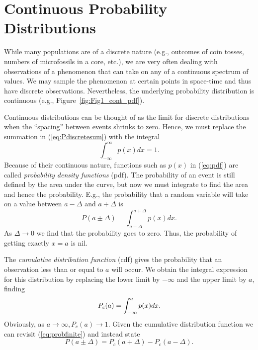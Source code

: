 \section{Continuous Probability Distributions}

	While many populations are of a discrete nature (e.g., outcomes of coin tosses, numbers of 
microfossils in a core, etc.), we are very often dealing with observations of a phenomenon that 
can take on any of a continuous spectrum of values.  We may sample the phenomenon at certain 
points in space-time and thus have discrete observations.  Nevertheless, the underlying probability 
distribution is continuous (e.g., Figure~\ref{fig:Fig1_cont_pdf}).


	Continuous distributions can be thought of as the limit for discrete distributions when the 
``spacing'' between events shrinks to zero.  Hence, we must replace the summation in (\ref{eq:Pdiscretesum}) with the integral
\begin{equation}
\int^\infty _{-\infty} p (x) d x = 1.
\label{eq:pdf}
\end{equation}
Because of their continuous nature, functions such as $p(x)$ in (\ref{eq:pdf}) are called \emph{probability} 
\emph{density functions} (pdf).  The probability of an event is still defined by the area under the curve, but 
now we must integrate to find the area and hence the probability.
E.g.,  the probability that a random variable will take on a  value between $a - \Delta$  and $a +\Delta$ is 
\begin{equation}
P(a\pm \Delta) =  \int ^{a+\Delta} _{a - \Delta} p(x) dx.
\label{eq:probfinite}
\end{equation}	 
As $\Delta \rightarrow 0$ we find that the probability goes to zero.  Thus, the probability of getting exactly $x = a $
is nil.

	The \emph{cumulative distribution function} (cdf) gives the probability that an observation less than or 
equal to $a$ will occur.  We obtain the integral expression for this distribution by replacing the 
lower limit by $-\infty$ and the upper limit by $a$, finding
\begin{equation}
	\index{Probability distribution!cumulative}
	\index{Cumulative probability distribution}
P_c(a) = \int^a _{-\infty} p (x) dx.
\end{equation}
Obviously, as $a \rightarrow \infty, P_c(a)\rightarrow 1$.  Given the cumulative distribution function we can
revisit (\ref{eq:probfinite}) and instead state
\begin{equation}
P(a\pm \Delta) =  P_c(a+\Delta) - P_c(a - \Delta).
\label{eq:probfinite2}
\end{equation}

